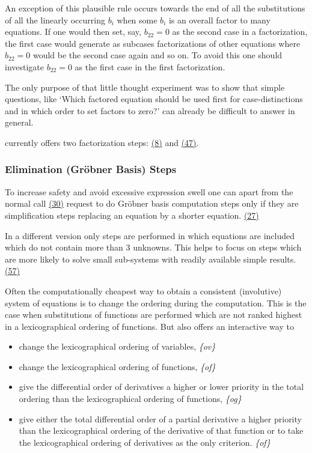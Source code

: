 An exception of this plausible rule occurs towards the end of all the
substitutions of all the linearly occurring $b_i$ when some $b_i$ is
an overall factor to many equations.  If one would then set, say,
$b_{22}=0$ as the second case in a factorization, the first case would
generate as subcases factorizations of other equations where
$b_{22}=0$ would be the second case again and so on.  To avoid this
one should investigate $b_{22}=0$ as the first case in the first
factorization.

The only purpose of that little thought experiment was to show that
simple questions, like `Which factored equation should be used first
for case-distinctions and in which order to set factors to zero?' can
already be difficult to answer in general.

 currently offers two factorization steps:
\hyperref[crack-m_8]{(8)} and \hyperref[crack-m_47]{(47)}.

\subsubsection{Elimination (Gr\"{o}bner Basis) Steps}

To increase safety and avoid excessive expression swell one can apart
from the normal call \hyperref[crack-m_30]{(30)} request to do
Gr\"{o}bner basis computation steps only if they are simplification
steps replacing an equation by a shorter equation.
\hyperref[crack-m_27]{(27)}

In a different version only steps are performed in which equations are
included which do not contain more than 3 unknowns.  This helps to
focus on steps which are more likely to solve small sub-systems with
readily available simple results.  \hyperref[crack-m_57]{(57)}

Often the computationally cheapest way to obtain a consistent
(involutive) system of equations is to change the ordering during the
computation.  This is the case when substitutions of functions are
performed which are not ranked highest in a lexicographical ordering
of functions.  But  also offers an interactive way to
\begin{itemize}
\item change the lexicographical ordering of variables, \emph{\{ov\}}
\item change the lexicographical ordering of functions, \emph{\{of\}}
\item give the differential order of derivatives a higher or lower
  priority in the total ordering than the lexicographical ordering of
  functions, \emph{\{og\}}
\item give either the total differential order of a partial derivative
  a higher priority than the lexicographical ordering of the
  derivative of that function or to take the lexicographical ordering
  of derivatives as the only criterion.  \emph{\{of\}}
\end{itemize}

